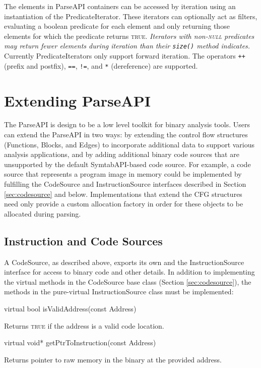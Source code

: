 \documentclass{article}
\newenvironment{apient}{\small\verbatim}{\endverbatim}
\newcommand{\apidesc}[1]{%
{\addtolength{\leftskip}{4em}%
#1\par\medskip}
}
\begin{document}
\noindent
The elements in ParseAPI containers can be accessed by iteration using an instantiation of the PredicateIterator. These iterators can optionally act as filters, evaluating a boolean predicate for each element and only returning those elements for which the predicate returns {\scshape true}. \emph{Iterators with non-{\scshape null} predicates may return fewer elements during iteration than their \texttt{size()} method indicates.} Currently PredicateIterators only support forward iteration. The operators \texttt{++} (prefix and postfix), \texttt{==}, \texttt{!=}, and \texttt{*} (dereference) are supported.


\appendix
\section{Extending ParseAPI}
\label{sec:extend}

The ParseAPI is design to be a low level toolkit for binary analysis tools.
Users can extend the ParseAPI in two ways: by extending the control flow
structures (Functions, Blocks, and Edges) to incorporate additional data to
support various analysis applications, and by adding additional binary code
sources that are unsupported by the default SymtabAPI-based code source. For
example, a code source that represents a program image in memory could be
implemented by fulfilling the CodeSource and InstructionSource interfaces
described in Section \ref{sec:codesource} and below. Implementations that
extend the CFG structures need only provide a custom allocation factory in
order for these objects to be allocated during parsing.

\subsection{Instruction and Code Sources}

A CodeSource, as described above, exports its own and the InstructionSource interface for access to binary code and other details. In addition to implementing the virtual methods in the CodeSource base class (Section \ref{sec:codesource}), the methods in the pure-virtual InstructionSource class must be implemented:

\begin{apient}
virtual bool isValidAddress(const Address) 
\end{apient}
\apidesc{Returns {\scshape true} if the address is a valid code location.}

\begin{apient}
virtual void* getPtrToInstruction(const Address)
\end{apient}
\apidesc{Returns pointer to raw memory in the binary at the provided address.}
\end{document}
